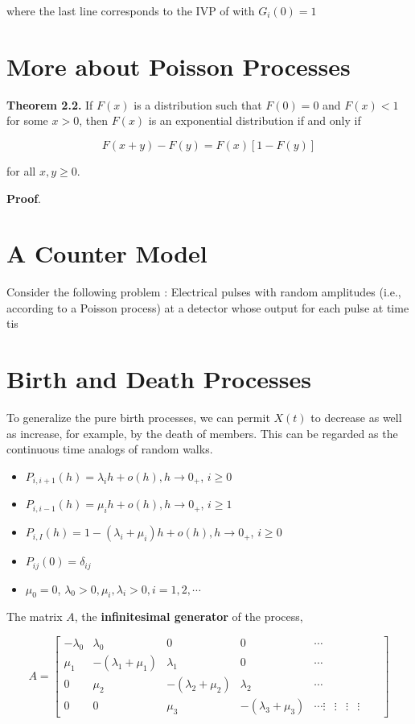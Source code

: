 \documentclass[12pt]{article}
\theoremstyle{nonumberbreak}
\begin{document}
where the last line corresponds to the IVP of with $G_i(0) = 1$


\section{More about Poisson Processes}


\textbf{Theorem 2.2.} If $F(x)$ is a distribution such that $F(0)=0$ and $F(x)<1$ for some $x>0$, then $F(x)$ is an exponential distribution if and only if 

$$
F(x+y) - F(y) = F(x) \left[ 1 - F(y) \right]
$$

for all $x,y \ge 0$.

\textbf{Proof}.


\section{A Counter Model}

Consider the following problem : Electrical pulses with random amplitudes
(i.e., according to a Poisson process) at a detector whose output for each pulse at time tis


\section{Birth and Death Processes}

To generalize the pure birth processes, we can permit $X(t)$ to decrease as well as increase, for example, by the death of members. This can be regarded as the continuous time analogs of random walks. 


\begin{itemize}
	\item $P_{i, i+1}(h) = \lambda_i h + o(h), h \to 0_+$, $i \ge 0$
	\item $P_{i, i-1}(h) = \mu_i h + o(h), h \to 0_+$, $i \ge 1$
	\item $P_{i,I} (h) = 1 -(\lambda_i + \mu_i) h + o(h), h \to 0_+$, $i \ge 0$
	\item $P_{ij} (0) = \delta_{ij}$
	\item $\mu_0 = 0$, $\lambda_0 > 0, \mu_i, \lambda_i > 0, i=1,2,\cdots$
\end{itemize}

The matrix $A$, the \textbf{infinitesimal generator} of the process,

$$
A = \begin{bmatrix}
-\lambda_0 & \lambda_0 & 0 & 0 & \cdots \\
\mu_1 & -(\lambda_1 + \mu_1)  & \lambda_1 & 0 & \cdots \\
0 & \mu_2 & -(\lambda_2 + \mu_2) & \lambda_2 & \cdots \\
0 & 0 & \mu_3 & -(\lambda_3 + \mu_3) & \cdots
\vdots & \vdots &  \vdots &  \vdots &   & 
\end{bmatrix}
$$
\end{document}
